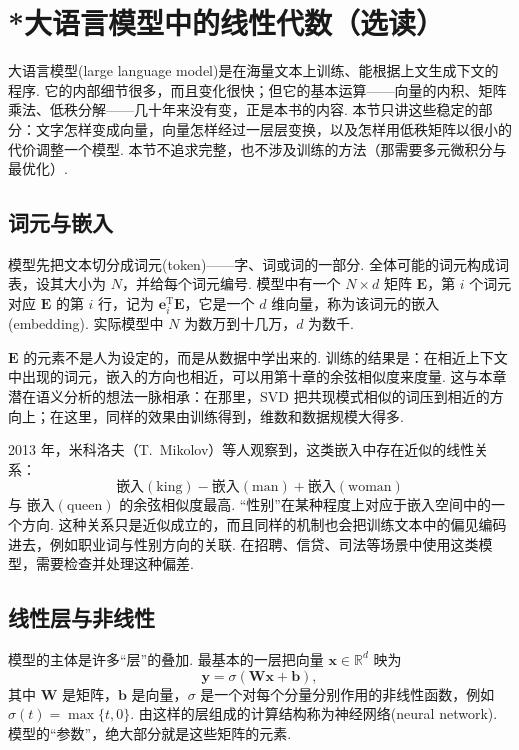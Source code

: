 \documentclass[lang=cn,10.5pt,scheme=chinese,toc=twocol,section,chinesefont=nofont,
twoside,citestyle=gb7714-2015,bibstyle=gb7714-2015]{elegantbook}
\DeclareRobustCommand{\textbf}[1]{{\lnsemiboldlatin\lnsemiboldcjk #1}}
\newcommand{\vv}[1]{\boldsymbol{#1}}
\newcommand{\trans}{\mathrm{T}}             %
\numberwithin{equation}{section}   %
\begin{document}
\section{*大语言模型中的线性代数（选读）}\label{sec:llm}

\textbf{大语言模型}(large language model)是在海量文本上训练、能根据上文生成下文的程序. 它的内部细节很多，而且变化很快；但它的基本运算——向量的内积、矩阵乘法、低秩分解——几十年来没有变，正是本书的内容. 本节只讲这些稳定的部分：文字怎样变成向量，向量怎样经过一层层变换，以及怎样用低秩矩阵以很小的代价调整一个模型. 本节不追求完整，也不涉及训练的方法（那需要多元微积分与最优化）.

\subsection{词元与嵌入}

模型先把文本切分成\textbf{词元}(token)——字、词或词的一部分. 全体可能的词元构成词表，设其大小为 $N$，并给每个词元编号. 模型中有一个 $N\times d$ 矩阵 $\vv E$，第 $i$ 个词元对应 $\vv E$ 的第 $i$ 行，记为 $\vv e_i^\trans\vv E$，它是一个 $d$ 维向量，称为该词元的\textbf{嵌入}(embedding). 实际模型中 $N$ 为数万到十几万，$d$ 为数千.

$\vv E$ 的元素不是人为设定的，而是从数据中学出来的. 训练的结果是：在相近上下文中出现的词元，嵌入的方向也相近，可以用第十章的余弦相似度来度量. 这与本章潜在语义分析的想法一脉相承：在那里，SVD 把共现模式相似的词压到相近的方向上；在这里，同样的效果由训练得到，维数和数据规模大得多.

2013 年，米科洛夫（T.~Mikolov）等人观察到，这类嵌入中存在近似的线性关系\cite{mikolov2013linguistic}：
\[
  \text{嵌入}(\text{king})-\text{嵌入}(\text{man})+\text{嵌入}(\text{woman})
\]
与 $\text{嵌入}(\text{queen})$ 的余弦相似度最高. “性别”在某种程度上对应于嵌入空间中的一个方向. 这种关系只是近似成立的，而且同样的机制也会把训练文本中的偏见编码进去，例如职业词与性别方向的关联. 在招聘、信贷、司法等场景中使用这类模型，需要检查并处理这种偏差.

\subsection{线性层与非线性}

模型的主体是许多“层”的叠加. 最基本的一层把向量 $\vv x\in\mathbb{R}^d$ 映为
\[
  \vv y=\sigma(\vv W\vv x+\vv b),
\]
其中 $\vv W$ 是矩阵，$\vv b$ 是向量，$\sigma$ 是一个对每个分量分别作用的非线性函数，例如 $\sigma(t)=\max\{t,0\}$. 由这样的层组成的计算结构称为\textbf{神经网络}(neural network). 模型的“参数”，绝大部分就是这些矩阵的元素.
\end{document}
